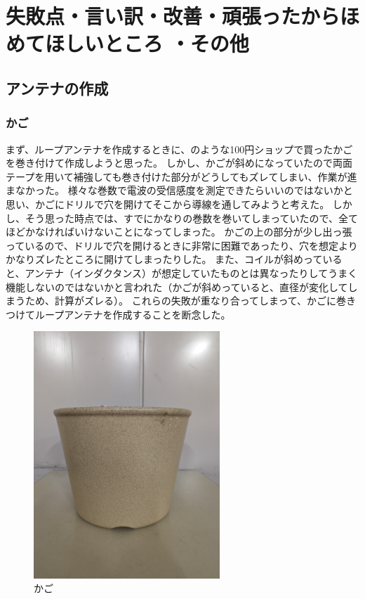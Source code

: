 \documentclass[report.tex]{subfiles}
\begin{document}
\section{失敗点・言い訳・改善・頑張ったからほめてほしいところ ・その他} \label{sec:失敗点}

\subsection{アンテナの作成}

\subsubsection{かご}

まず、ループアンテナを作成するときに、のような100円ショップで買ったかごを巻き付けて作成しようと思った。
しかし、かごが斜めになっていたので両面テープを用いて補強しても巻き付けた部分がどうしてもズレてしまい、作業が進まなかった。
様々な巻数で電波の受信感度を測定できたらいいのではないかと思い、かごにドリルで穴を開けてそこから導線を通してみようと考えた。
しかし、そう思った時点では、すでにかなりの巻数を巻いてしまっていたので、全てほどかなければいけないことになってしまった。
かごの上の部分が少し出っ張っているので、ドリルで穴を開けるときに非常に困難であったり、穴を想定よりかなりズレたところに開けてしまったりした。
また、コイルが斜めっていると、アンテナ（インダクタンス）が想定していたものとは異なったりしてうまく機能しないのではないかと言われた（かごが斜めっていると、直径が変化してしまうため、計算がズレる）。
これらの失敗が重なり合ってしまって、かごに巻きつけてループアンテナを作成することを断念した。

\begin{figure}[H]
	\centering
	\includegraphics[width=7cm]{use/kago.jpg}
	\caption{かご}
	\label{fig:kago}
\end{figure}
\end{document}
